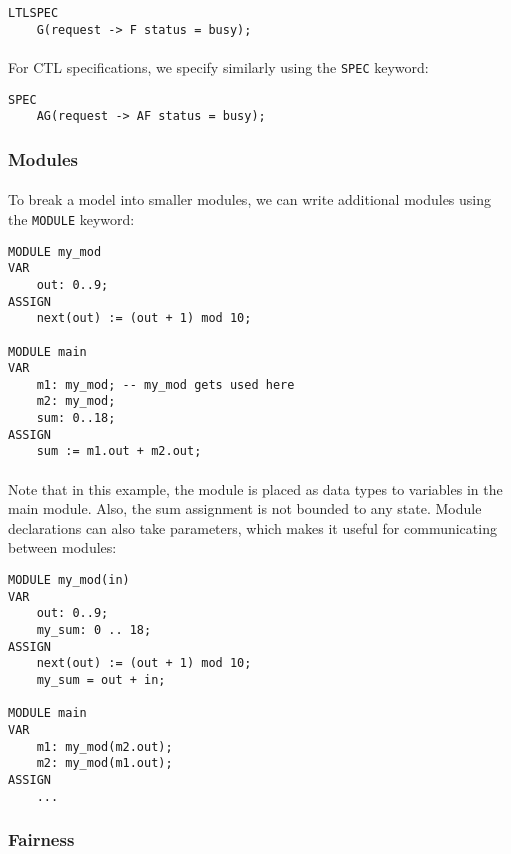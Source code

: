\documentclass{article}
\theoremstyle{plain}
\theoremstyle{definition}
\begin{document}
\begin{multicols}{2}
\begin{lstlisting}
LTLSPEC
	G(request -> F status = busy);
\end{lstlisting}

\paragraph{} For CTL specifications, we specify similarly using the \lstinline{SPEC} keyword: 

\begin{lstlisting}
SPEC
	AG(request -> AF status = busy);
\end{lstlisting}

\subsubsection{Modules}

\paragraph{} To break a model into smaller modules, we can write additional modules using the \lstinline{MODULE} keyword:

\begin{lstlisting}
MODULE my_mod
VAR
	out: 0..9;
ASSIGN
	next(out) := (out + 1) mod 10;

MODULE main
VAR
	m1: my_mod; -- my_mod gets used here
	m2: my_mod;
	sum: 0..18;
ASSIGN
	sum := m1.out + m2.out;
\end{lstlisting}

\paragraph{} Note that in this example, the module is placed as data types to variables in the main module. Also, the sum assignment is not bounded to any state. Module declarations can also take parameters, which makes it useful for communicating between modules:

\begin{lstlisting}
MODULE my_mod(in)
VAR
	out: 0..9;
	my_sum: 0 .. 18;
ASSIGN
	next(out) := (out + 1) mod 10;
	my_sum = out + in;

MODULE main
VAR
	m1: my_mod(m2.out);
	m2: my_mod(m1.out);
ASSIGN
	...
\end{lstlisting}

\subsubsection{Fairness}


\end{multicols}
\end{document}
